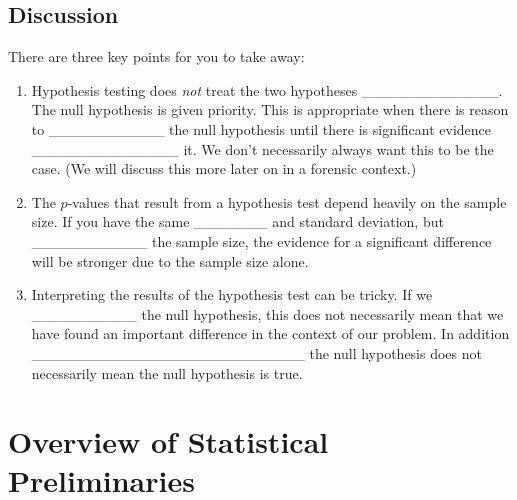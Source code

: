 \documentclass[]{book}
\providecommand{\tightlist}{%
  \setlength{\itemsep}{0pt}\setlength{\parskip}{0pt}}
\theoremstyle{definition}
\theoremstyle{definition}
\theoremstyle{remark}
\begin{document}
\subsection{Discussion}\label{discussion}

There are three key points for you to take away:

\begin{enumerate}
\def\labelenumi{\arabic{enumi}.}
\tightlist
\item
  Hypothesis testing does \emph{not} treat the two hypotheses
  \_\_\_\_\_\_\_\_\_\_\_\_\_. The null hypothesis is given priority.
  This is appropriate when there is reason to \_\_\_\_\_\_\_\_\_\_\_ the
  null hypothesis until there is significant evidence
  \_\_\_\_\_\_\_\_\_\_\_\_\_\_ it. We don't necessarily always want this
  to be the case. (We will discuss this more later on in a forensic
  context.) \vspace{.1in}
\item
  The \(p\)-values that result from a hypothesis test depend heavily on
  the sample size. If you have the same \_\_\_\_\_\_\_ and standard
  deviation, but \_\_\_\_\_\_\_\_\_\_\_ the sample size, the evidence
  for a significant difference will be stronger due to the sample size
  alone. \vspace{.1in}
\item
  Interpreting the results of the hypothesis test can be tricky. If we
  \_\_\_\_\_\_\_\_\_\_ the null hypothesis, this does not necessarily
  mean that we have found an important difference in the context of our
  problem. In addition
  \_\_\_\_\_\_\_\_\_\_\_\_\_\_\_\_\_\_\_\_\_\_\_\_\_\_ the null
  hypothesis does not necessarily mean the null hypothesis is true.
\end{enumerate}

\section{Overview of Statistical
Preliminaries}\label{overview-of-statistical-preliminaries}
\end{document}
